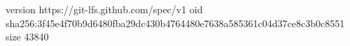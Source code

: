 version https://git-lfs.github.com/spec/v1
oid sha256:3f45e4f70b9d6480fba29dc430b4764480e7638a585361c04d37ce8c3b0c8551
size 43840
